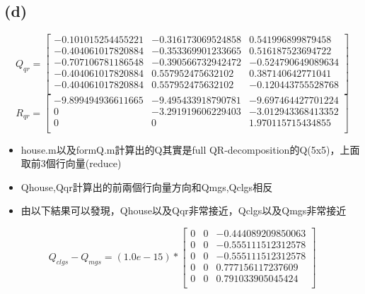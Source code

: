 \documentclass{article}
\begin{document}
        \subsection*{(d)}
            \begin{equation*}
                Q_{qr} = \left[
                \begin{array}{ccc}
                    -0.101015254455221 & -0.316173069524858 &  0.541996899879458\\
                    -0.404061017820884 & -0.353369901233665 &  0.516187523694722\\
                    -0.707106781186548 & -0.390566732942472 & -0.524790649089634\\
                    -0.404061017820884 &  0.557952475632102 &  0.387140642771041\\
                    -0.404061017820884 &  0.557952475632102 & -0.120443755528768\\
                \end{array}
                \right]
            \end{equation*}
            \begin{equation*}
                R_{qr} = \left[    
                \begin{array}{ccc}
                    -9.899494936611665 & -9.495433918790781 & -9.697464427701224\\
                    0 & -3.291919606229403 & -3.012943368413352\\
                    0 &                  0 &  1.970115715434855\\
                \end{array}
                \right]
            \end{equation*}
        \begin{itemize}
            \item house.m以及formQ.m計算出的Q其實是full QR-decomposition的Q(5x5)，上面取前3個行向量(reduce)
            \item Qhouse,Qqr計算出的前兩個行向量方向和Qmgs,Qclgs相反
            \item 由以下結果可以發現，Qhouse以及Qqr非常接近，Qclgs以及Qmgs非常接近
        \end{itemize}
            \begin{equation*}
                Q_{clgs} - Q_{mgs} = (1.0e-15) * \left[
                \begin{array}{ccc}
                    0 &                  0 & -0.444089209850063\\
                    0 &                  0 & -0.555111512312578\\
                    0 &                  0 & -0.555111512312578\\
                    0 &                  0 &  0.777156117237609\\
                    0 &                  0 &  0.791033905045424\\
                \end{array}
                \right]
            \end{equation*}
\end{document}
